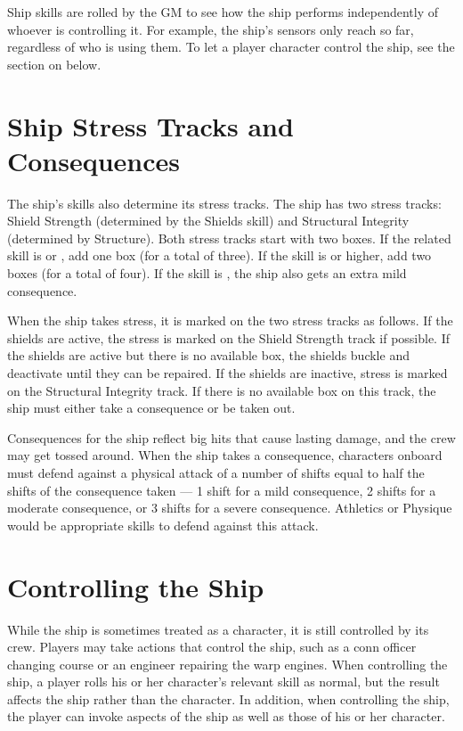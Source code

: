 \documentclass[12pt,titlepage,openany]{book}
\begin{document}
Ship skills are rolled by the GM to see how the ship performs independently of
whoever is controlling it. For example, the ship's sensors only reach so far,
regardless of who is using them. To let a player character control the ship, see
the section on  below.

\section{Ship Stress Tracks and Consequences}\label{sec:ship-stress}

The ship's skills also determine its stress tracks. The ship has two stress
tracks: Shield Strength (determined by the Shields skill) and Structural
Integrity (determined by Structure). Both stress tracks start with two boxes.
If the related skill is  or , add one box (for a total
of three). If the skill is  or higher, add two boxes (for a total
of four). If the skill is , the ship also gets an extra mild
consequence.

When the ship takes stress, it is marked on the two stress tracks as follows.
If the shields are active, the stress is marked on the Shield Strength track if
possible. If the shields are active but there is no available box, the shields
buckle and deactivate until they can be repaired. If the shields are inactive,
stress is marked on the Structural Integrity track. If there is no available
box on this track, the ship must either take a consequence or be taken out.

Consequences for the ship reflect big hits that cause lasting damage, and the
crew may get tossed around. When the ship takes a consequence, characters
onboard must defend against a physical attack of a number of shifts equal to
half the shifts of the consequence taken --- 1 shift for a mild consequence, 2
shifts for a moderate consequence, or 3 shifts for a severe consequence.
Athletics or Physique would be appropriate skills to defend against this
attack.

\section{Controlling the Ship}\label{sec:control-ship}

While the ship is sometimes treated as a character, it is still controlled by
its crew. Players may take actions that control the ship, such as a conn
officer changing course or an engineer repairing the warp engines. When
controlling the ship, a player rolls his or her character's relevant skill as
normal, but the result affects the ship rather than the character. In addition,
when controlling the ship, the player can invoke aspects of the ship as well as
those of his or her character.
\end{document}
